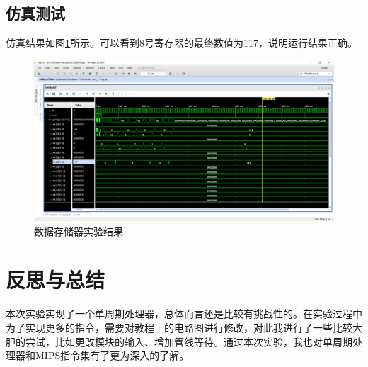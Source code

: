 \documentclass{progartcn}
\begin{document}
\subsection{仿真测试}

仿真结果如图\ref{fig:1}所示。可以看到8号寄存器的最终数值为117，说明运行结果正确。

\begin{figure}[htbp]
    \centering
    \includegraphics[scale=0.3]{../figure/05/lab05-1.PNG}
    \caption{数据存储器实验结果}\label{fig:1}
\end{figure}

\section{反思与总结}

本次实验实现了一个单周期处理器，总体而言还是比较有挑战性的。在实验过程中为了实现更多的指令，需要对教程上的电路图进行修改，对此我进行了一些比较大胆的尝试，比如更改模块的输入、增加管线等待。通过本次实验，我也对单周期处理器和MIPS指令集有了更为深入的了解。
\end{document}

